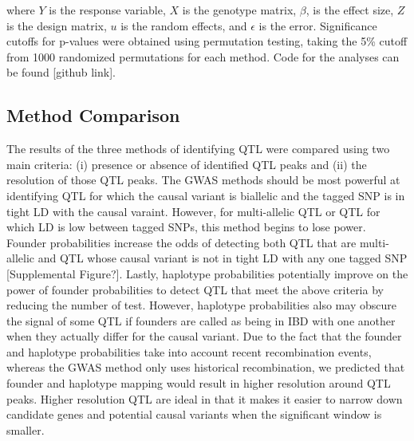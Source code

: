 \documentclass[article,9pt,twocolumn,twoside]{rilabRxiv}
\begin{document}
where $Y$ is the response variable, $X$ is the genotype matrix, $\beta$,
is the effect size, $Z$ is the design matrix, $u$ is the random
effects, and $\epsilon$ is the error. Significance cutoffs for p-values were
 obtained using permutation testing, taking the 5\% cutoff from 1000 randomized
  permutations for each method. Code for the analyses can be found [github link].

\subsection{Method Comparison}
The results of the three methods of identifying QTL were compared using two main
criteria: (i) presence or absence of identified QTL peaks and (ii) the resolution
of those QTL peaks. The GWAS methods should be most powerful at identifying QTL
for which the causal variant is biallelic and the tagged SNP is in tight LD with
the causal varaint. However, for multi-allelic QTL or QTL for which LD is low
between tagged SNPs, this method begins to lose power. Founder probabilities increase
the odds of detecting both QTL that are multi-allelic and QTL whose causal variant
is not in tight LD with any one tagged SNP [Supplemental Figure?]. Lastly,
haplotype probabilities potentially improve on the power of founder probabilities
to detect QTL that meet the above criteria by reducing the number of test. However,
haplotype probabilities also may obscure the signal of some QTL if founders are
called as being in IBD with one another when they actually differ for the causal
variant. Due to the fact that the founder and haplotype probabilities
take into account recent recombination events, whereas the GWAS method only uses
historical recombination, we predicted that founder and haplotype mapping would
result in higher resolution around QTL peaks. Higher resolution QTL are ideal in
that it makes it easier to narrow down candidate genes and potential causal variants
when the significant window is smaller.

\end{document}
